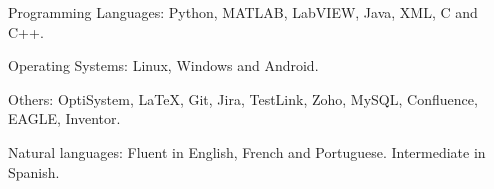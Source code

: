 \documentclass[12pt,a4paper]{article} %
\begin{document}
\spacedhrule{-0.2em}{-0.4em} %




\inlineheadsection %
{Programming Languages:}
{Python, MATLAB, LabVIEW, Java, XML, C and C++.}

\inlineheadsection
{Operating Systems:} 
{Linux, Windows and Android.}

\inlineheadsection
{Others:} 
{OptiSystem, \LaTeX, Git, Jira, TestLink, Zoho, MySQL, Confluence, EAGLE, Inventor.}

\vspace{0.18cm}
\inlineheadsection %
{Natural languages:}
{Fluent in English, French and Portuguese. Intermediate in Spanish.}


\spacedhrule{1.6em}{-0.4em} %


\end{document}
